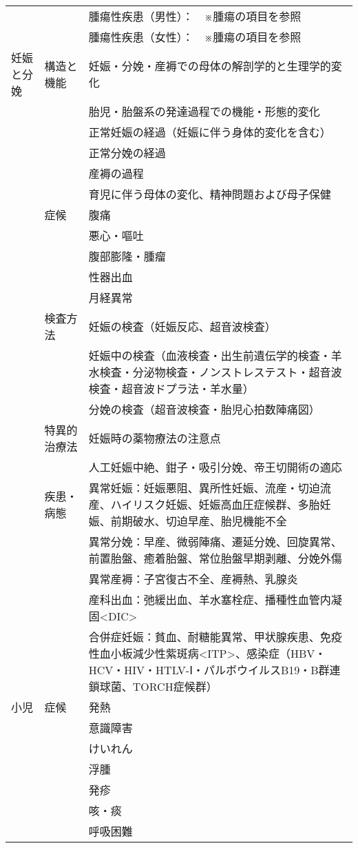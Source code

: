 \documentclass[
]{ltjsarticle}
\begin{document}
\begin{xltabular}{\linewidth}{XXX}
 &  & 腫瘍性疾患（男性）：　※腫瘍の項目を参照 \\
 &  & 腫瘍性疾患（女性）：　※腫瘍の項目を参照 \\
妊娠と分娩 & 構造と機能 & 妊娠・分娩・産褥での母体の解剖学的と生理学的変化 \\
 &  & 胎児・胎盤系の発達過程での機能・形態的変化 \\
 &  & 正常妊娠の経過（妊娠に伴う身体的変化を含む） \\
 &  & 正常分娩の経過 \\
 &  & 産褥の過程 \\
 &  & 育児に伴う母体の変化、精神問題および母子保健 \\
 & 症候 & 腹痛 \\
 &  & 悪心・嘔吐 \\
 &  & 腹部膨隆・腫瘤 \\
 &  & 性器出血 \\
 &  & 月経異常 \\
 & 検査方法 & 妊娠の検査（妊娠反応、超音波検査） \\
 &  & 妊娠中の検査（血液検査・出生前遺伝学的検査・羊水検査・分泌物検査・ノンストレステスト・超音波検査・超音波ドプラ法・羊水量） \\
 &  & 分娩の検査（超音波検査・胎児心拍数陣痛図） \\
 & 特異的治療法 & 妊娠時の薬物療法の注意点 \\
 &  & 人工妊娠中絶、鉗子・吸引分娩、帝王切開術の適応 \\
 & 疾患・病態 & 異常妊娠：妊娠悪阻、異所性妊娠、流産・切迫流産、ハイリスク妊娠、妊娠高血圧症候群、多胎妊娠、前期破水、切迫早産、胎児機能不全 \\
 &  & 異常分娩：早産、微弱陣痛、遷延分娩、回旋異常、前置胎盤、癒着胎盤、常位胎盤早期剥離、分娩外傷 \\
 &  & 異常産褥：子宮復古不全、産褥熱、乳腺炎 \\
 &  & 産科出血：弛緩出血、羊水塞栓症、播種性血管内凝固<DIC> \\
 &  & 合併症妊娠：貧血、耐糖能異常、甲状腺疾患、免疫性血小板減少性紫斑病<ITP>、感染症（HBV・HCV・HIV・HTLV-Ⅰ・パルボウイルスB19・B群連鎖球菌、TORCH症候群） \\
小児 & 症候 & 発熱 \\
 &  & 意識障害 \\
 &  & けいれん \\
 &  & 浮腫 \\
 &  & 発疹 \\
 &  & 咳・痰 \\
 &  & 呼吸困難 \\

\end{xltabular}
\end{document}
